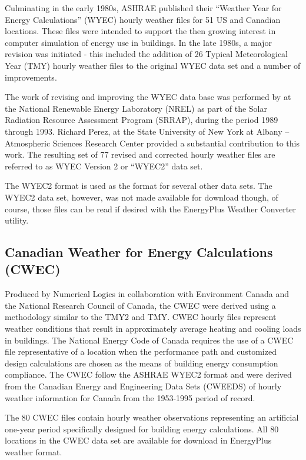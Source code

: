 Culminating in the early 1980s, ASHRAE published their ``Weather Year for Energy Calculations'' (WYEC) hourly weather files for 51 US and Canadian locations. These files were intended to support the then growing interest in computer simulation of energy use in buildings. In the late 1980s, a major revision was initiated - this included the addition of 26 Typical Meteorological Year (TMY) hourly weather files to the original WYEC data set and a number of improvements.

The work of revising and improving the WYEC data base was performed by at the National Renewable Energy Laboratory (NREL) as part of the Solar Radiation Resource Assessment Program (SRRAP), during the period 1989 through 1993. Richard Perez, at the State University of New York at Albany -- Atmospheric Sciences Research Center provided a substantial contribution to this work. The resulting set of 77 revised and corrected hourly weather files are referred to as WYEC Version 2 or ``WYEC2'' data set.

The WYEC2 format is used as the format for several other data sets. The WYEC2 data set, however, was not made available for download though, of course, those files can be read if desired with the EnergyPlus Weather Converter utility.

\subsection{Canadian Weather for Energy Calculations (CWEC)}\label{canadian-weather-for-energy-calculations-cwec}

Produced by Numerical Logics in collaboration with Environment Canada and the National Research Council of Canada, the CWEC were derived using a methodology similar to the TMY2 and TMY. CWEC hourly files represent weather conditions that result in approximately average heating and cooling loads in buildings. The National Energy Code of Canada requires the use of a CWEC file representative of a location when the performance path and customized design calculations are chosen as the means of building energy consumption compliance. The CWEC follow the ASHRAE WYEC2 format and were derived from the Canadian Energy and Engineering Data Sets (CWEEDS) of hourly weather information for Canada from the 1953-1995 period of record.

The 80 CWEC files contain hourly weather observations representing an artificial one-year period specifically designed for building energy calculations. All 80 locations in the CWEC data set are available for download in EnergyPlus weather format.

